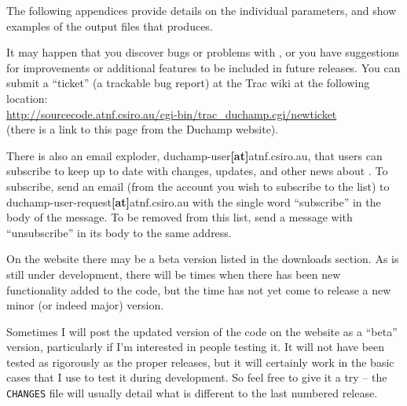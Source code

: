 The following appendices provide details on the individual parameters,
and show examples of the output files that \duchamp produces.

It may happen that you discover bugs or problems with \duchamp, or you
have suggestions for improvements or additional features to be
included in future releases. You can submit a ``ticket'' (a trackable
bug report) at the \duchamp Trac wiki at the following location:\\
\href{http://sourcecode.atnf.csiro.au/cgi-bin/trac\_duchamp.cgi/newticket}%
{\footnotesize 
http://sourcecode.atnf.csiro.au/cgi-bin/trac\_duchamp.cgi/newticket}
\\(there is a link to this page from the Duchamp website).

There is also an email exploder, duchamp-user\textbf{[at]}atnf.csiro.au,
that users can subscribe to keep up to date with changes, updates, and
other news about \duchamp. To subscribe, send an email (from the
account you wish to subscribe to the list) to
duchamp-user-request\textbf{[at]}atnf.csiro.au with the single word
``subscribe'' in the body of the message. To be removed from this
list, send a message with ``unsubscribe'' in its body to the same
address.


On the \duchamp website there may be a beta version listed in the
downloads section. As \duchamp is still under development, there will
be times when there has been new functionality added to the code, but
the time has not yet come to release a new minor (or indeed major)
version. 

Sometimes I will post the updated version of the code on the website
as a ``beta'' version, particularly if I'm interested in people
testing it. It will not have been tested as rigorously as the proper
releases, but it will certainly work in the basic cases that I use to
test it during development. So feel free to give it a try -- the
\texttt{CHANGES} file will usually detail what is different to the last
numbered release.
